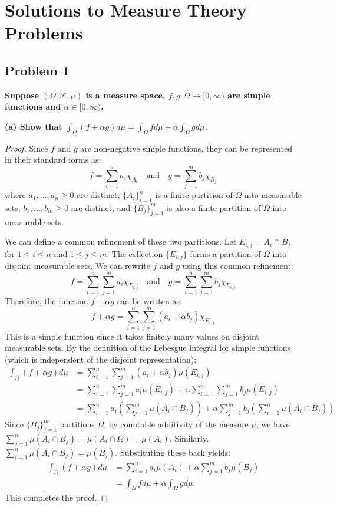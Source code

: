\documentclass[11pt]{article}
\begin{document}
\section*{Solutions to Measure Theory Problems}

\subsection*{Problem 1}
\textbf{Suppose $(\Omega, \mathcal{F}, \mu)$ is a measure space, $f, g: \Omega \to [0, \infty)$ are simple functions and $\alpha \in [0, \infty)$.}

\vspace{0.5em}
\noindent \textbf{(a) Show that $\int_\Omega (f + \alpha g) d\mu = \int_\Omega f d\mu + \alpha \int_\Omega g d\mu$.}

\begin{proof}
Since $f$ and $g$ are non-negative simple functions, they can be represented in their standard forms as:
\[ f = \sum_{i=1}^{n} a_i \chi_{A_i} \quad \text{and} \quad g = \sum_{j=1}^{m} b_j \chi_{B_j} \]
where $a_1, \dots, a_n \ge 0$ are distinct, $\{A_i\}_{i=1}^n$ is a finite partition of $\Omega$ into measurable sets, $b_1, \dots, b_m \ge 0$ are distinct, and $\{B_j\}_{j=1}^m$ is also a finite partition of $\Omega$ into measurable sets.

We can define a common refinement of these two partitions. Let $E_{i,j} = A_i \cap B_j$ for $1 \le i \le n$ and $1 \le j \le m$. The collection $\{E_{i,j}\}$ forms a partition of $\Omega$ into disjoint measurable sets. 
We can rewrite $f$ and $g$ using this common refinement:
\[ f = \sum_{i=1}^{n} \sum_{j=1}^{m} a_i \chi_{E_{i,j}} \quad \text{and} \quad g = \sum_{i=1}^{n} \sum_{j=1}^{m} b_j \chi_{E_{i,j}} \]
Therefore, the function $f + \alpha g$ can be written as:
\[ f + \alpha g = \sum_{i=1}^{n} \sum_{j=1}^{m} (a_i + \alpha b_j) \chi_{E_{i,j}} \]
This is a simple function since it takes finitely many values on disjoint measurable sets. By the definition of the Lebesgue integral for simple functions (which is independent of the disjoint representation):
\begin{align*}
\int_\Omega (f + \alpha g) d\mu &= \sum_{i=1}^{n} \sum_{j=1}^{m} (a_i + \alpha b_j) \mu(E_{i,j}) \\
&= \sum_{i=1}^{n} \sum_{j=1}^{m} a_i \mu(E_{i,j}) + \alpha \sum_{i=1}^{n} \sum_{j=1}^{m} b_j \mu(E_{i,j}) \\
&= \sum_{i=1}^{n} a_i \left( \sum_{j=1}^{m} \mu(A_i \cap B_j) \right) + \alpha \sum_{j=1}^{m} b_j \left( \sum_{i=1}^{n} \mu(A_i \cap B_j) \right)
\end{align*}
Since $\{B_j\}_{j=1}^m$ partitions $\Omega$, by countable additivity of the measure $\mu$, we have $\sum_{j=1}^{m} \mu(A_i \cap B_j) = \mu(A_i \cap \Omega) = \mu(A_i)$. Similarly, $\sum_{i=1}^{n} \mu(A_i \cap B_j) = \mu(B_j)$. Substituting these back yields:
\begin{align*}
\int_\Omega (f + \alpha g) d\mu &= \sum_{i=1}^{n} a_i \mu(A_i) + \alpha \sum_{j=1}^{m} b_j \mu(B_j) \\
&= \int_\Omega f d\mu + \alpha \int_\Omega g d\mu.
\end{align*}
This completes the proof.
\end{proof}
\end{document}
